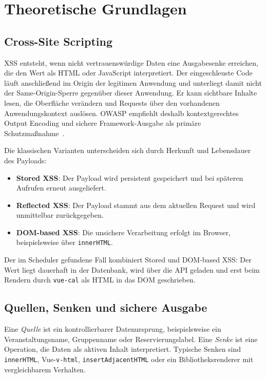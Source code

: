 \section{Theoretische Grundlagen}
\label{sec:grundlagen}

\subsection{Cross-Site Scripting}

XSS entsteht, wenn nicht vertrauenswürdige Daten eine Ausgabesenke
erreichen, die den Wert als HTML oder JavaScript interpretiert. Der
eingeschleuste Code läuft anschließend im Origin der legitimen
Anwendung und unterliegt damit nicht der Same-Origin-Sperre gegenüber
dieser Anwendung. Er kann sichtbare Inhalte lesen, die Oberfläche
verändern und Requests über den vorhandenen Anwendungskontext
auslösen. OWASP empfiehlt deshalb kontextgerechtes Output Encoding
und sichere Framework-Ausgabe als primäre Schutzmaßnahme~\cite{owaspXss}.

Die klassischen Varianten unterscheiden sich durch Herkunft und
Lebensdauer des Payloads:

\begin{itemize}
  \item \textbf{Stored XSS}: Der Payload wird persistent gespeichert
    und bei späteren Aufrufen erneut ausgeliefert.
  \item \textbf{Reflected XSS}: Der Payload stammt aus dem aktuellen
    Request und wird unmittelbar zurückgegeben.
  \item \textbf{DOM-based XSS}: Die unsichere Verarbeitung erfolgt im
    Browser, beispielsweise über \texttt{innerHTML}.
\end{itemize}

Der im Scheduler gefundene Fall kombiniert Stored und DOM-based XSS:
Der Wert liegt dauerhaft in der Datenbank, wird über die API geladen
und erst beim Rendern durch \texttt{vue-cal} als HTML in das DOM geschrieben.

\subsection{Quellen, Senken und sichere Ausgabe}

Eine \emph{Quelle} ist ein kontrollierbarer Datenursprung,
beispielsweise ein Veranstaltungsname, Gruppenname oder
Reservierungslabel. Eine \emph{Senke} ist eine Operation, die Daten
als aktiven Inhalt interpretiert. Typische Senken sind
\texttt{innerHTML}, Vue-\texttt{v-html}, \texttt{insertAdjacentHTML}
oder ein Bibliotheksrenderer mit vergleichbarem Verhalten.

